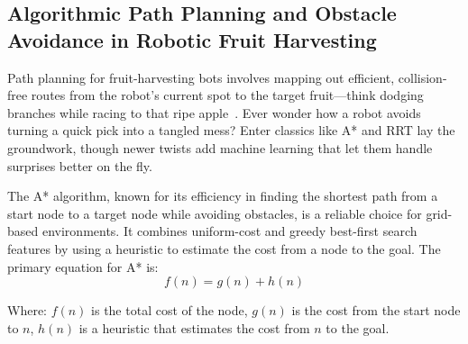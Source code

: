 \documentclass[a4paper,fleqn]{cas-dc}
\begin{document}
\subsection{Algorithmic Path Planning and Obstacle Avoidance in Robotic Fruit Harvesting}
Path planning for fruit-harvesting bots involves mapping out efficient, collision-free routes from the robot's current spot to the target fruit—think dodging branches while racing to that ripe apple~\cite {Leong:2024_review}. Ever wonder how a robot avoids turning a quick pick into a tangled mess? Enter classics like A* and RRT lay the groundwork, though newer twists add machine learning that let them handle surprises better on the fly.

The A* algorithm, known for its efficiency in finding the shortest path from a start node to a target node while avoiding obstacles, is a reliable choice for grid-based environments. It combines uniform-cost and greedy best-first search features by using a heuristic to estimate the cost from a node to the goal. The primary equation for A* is:
\begin{equation}
f(n) = g(n) + h(n)
\label{eq:astar}
\end{equation}

Where:
$f(n)$ is the total cost of the node, 
$g(n)$ is the cost from the start node to $n$, 
$h(n)$ is a heuristic that estimates the cost from $n$ to the goal.
\end{document}
